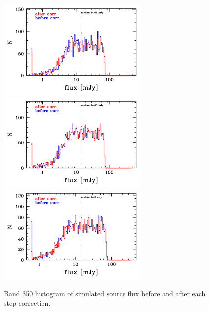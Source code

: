 \documentclass[11pt,a4paper]{article}
\begin{document}
\begin{figure}[H]
	\caption{
		Band 350 histogram of simulated source flux before and after each step correction. 
	}
	\includegraphics[width=0.65\textwidth]{galsim_350_hist_flux_1}
	\includegraphics[width=0.65\textwidth]{galsim_350_hist_flux_2}
	\includegraphics[width=0.65\textwidth]{galsim_350_hist_flux_3}
\end{figure}
\end{document}
